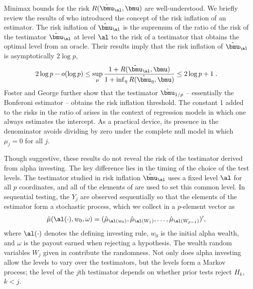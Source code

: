 \documentclass[12pt]{article}
\begin{document}
 Minimax bounds for the risk $R(\hat{\bmu}_\al,\bmu)$ are well-understood.  We briefly
 review the results of \citet{fostergeorge94} who introduced the concept of the
 risk inflation of an estimator. \citep[][obtain similar results.]
  {donohojohnstone94} The risk inflation of $\hat{\bmu}_\al$ is the supremum of
 the ratio of the risk of the testimator $\hat{\bmu}_\al$ at level $\al$ to the
 risk of a testimator that obtains the optimal level from an oracle. 
  Their results imply that the risk inflation of $\hat{\bmu}_\al$ is
 asymptotically $2 \log p$,
 \begin{equation}
    2 \log p - o(\log p) 
    \le
    \sup_\mu  \frac{1 + R(\hat{\bmu}_\al,\bmu)}
                   {1 + \inf_\eta{R(\hat{\bmu}_\eta,\bmu)}}  
    \le 
    2 \log p + 1 \;.
 \label{eq:ri}
 \end{equation}
 Foster and George further show that the testimator $\hat{\bmu}_{1/p}$ --
 essentially the Bonferoni estimator -- obtains the risk inflation threshold.
  The constant 1 added to the risks in the ratio of  arises in the
 context of regression models in which one always estimates the intercept.  As a
 practical device, its presence in the denominator avoids dividing by zero under
 the complete null model in which $\mu_j = 0$ for all $j$.


 Though suggestive, these results do not reveal the risk of the testimator
 derived from alpha investing.  The key difference lies in the timing of the
 choice of the test levels.  The testimator studied in risk inflation
 $\hat{\bmu}_\al$ uses a fixed level $\al$ for all $p$ coordinates, and all of
 the elements of \YY are used to set this common level.  In sequential testing,
 the $Y_j$ are observed sequentially so that the elements of the estimator form
 a stochastic process, which we collect in a $p$-element vector as
 \begin{equation}
   \hat\mu(\al(\cdot),w_0,\omega) = (\hat\mu_{\al(w_0)}, \hat\mu_{\al(W_1)}, \ldots, 
                       \hat\mu_{\al(W_{p-1})})',
 \label{eq:muHatAlphaInv}
 \end{equation}
 where $\al(\cdot)$ denotes the defining investing rule, $w_0$ is the initial
 alpha wealth, and $\omega$ is the payout earned when rejecting a hypothesis.
  The wealth random variables $W_j$ given in  contribute the
 randomness.  Not only does alpha investing allow the levels to vary over the
 testimators, but the levels form a Markov process; the level of the $j$th
 testimator depends on whether prior tests reject $H_k$, $k < j$.
\end{document}
